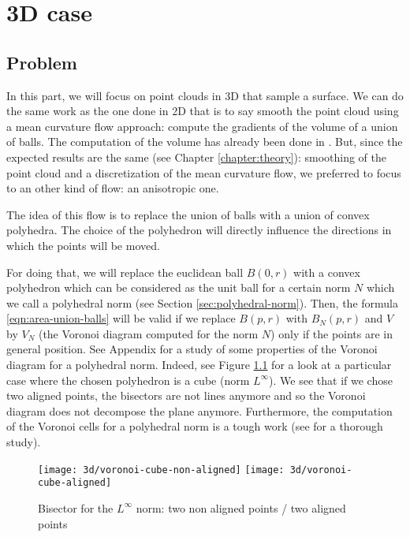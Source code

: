 \chapter{3D case}
\label{chapter:3d}

\section{Problem}

In this part, we will focus on point clouds in 3D that sample a surface.  We can
do the same work as the one done in 2D that is to say smooth the point cloud
using a mean curvature flow approach: compute the gradients of the volume of a
union of balls. The computation of the volume has already been done in
\cite{cazals2011computing}. But, since the expected results are the
same (see Chapter \ref{chapter:theory}): smoothing of the point cloud and a
discretization of the mean curvature flow, we preferred to focus to an other
kind of flow: an anisotropic one.

The idea of this flow is to replace the union of balls with a union of convex
polyhedra. The choice of the polyhedron will directly influence the directions
in which the points will be moved.

For doing that, we will replace the euclidean ball $ B(0, r) $ with a convex
polyhedron which can be considered as the unit ball for a certain norm $ N $
which we call a polyhedral norm (see Section \ref{sec:polyhedral-norm}). Then,
the formula \ref{eqn:area-union-balls} will be valid if we replace $ B(p, r) $
with $ B_N(p, r) $ and $ V $ by $ V_N $ (the Voronoi diagram computed for the
norm $ N $) only if the points are in general position. See Appendix
 for a study of some properties of
the Voronoi diagram for a polyhedral norm. Indeed, see Figure
\ref{fig:3d-voronoi-cube} for a look at a particular case where the chosen
polyhedron is a cube (norm $ L^\infty $). We see that if we chose two aligned
points, the bisectors are not lines anymore and so the Voronoi diagram does not
decompose the plane anymore. Furthermore, the computation of the Voronoi cells
for a polyhedral norm is a tough work (see \cite{ma2000bisectors} for a thorough
study).

\begin{figure}[h]
    \centering

    \texttt{[image: 3d/voronoi-cube-non-aligned]}
    \hspace{2cm}
    \texttt{[image: 3d/voronoi-cube-aligned]}
    \caption{Bisector for the $ L^\infty $ norm: two non aligned points / two
        aligned points}
    \label{fig:3d-voronoi-cube}
\end{figure}

